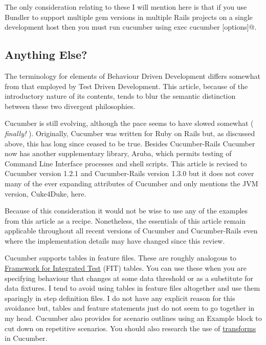 The only consideration relating to these I will mention here is that if you use Bundler to support multiple gem versions in multiple Rails projects on a single development host then you must run cucumber using \verb@bundle exec cucumber [options]@.

\subsection{Anything Else?}

The terminology for elements of Behaviour Driven Development differs somewhat from that employed by Test Driven Development.  This article, because of the introductory nature of its contents, tends to blur the semantic distinction between these two divergent philosophies.

Cucumber is still evolving, although the pace seems to have slowed somewhat ( \emph{finally!} ).  Originally, Cucumber was written for Ruby on Rails but,  as discussed above, this has long since ceased to be true. Besides Cucumber-Rails Cucumber now has another supplementary library, Aruba, which permits testing of Command Line Interface processes and shell scripts.  This article is revised to Cucumber version 1.2.1 and Cucumber-Rails version 1.3.0 but it does not cover many of the ever expanding attributes of Cucumber and only mentions the JVM version, Cuke4Duke, here.

Because of this consideration it would not be wise to use any of the examples from this article as a recipe. Nonetheless, the essentials of this article remain applicable throughout all recent versions of Cucumber and Cucumber-Rails even where the implementation details may have changed since this review.

Cucumber supports tables in feature files.  These are roughly analogous to \href{http://fit.c2.com/}{Framework for Integrated Test} (FIT) tables.  You can use these when you are specifying behaviour that changes at some data threshold or as a substitute for data fixtures.  I tend to avoid using tables in feature files altogether and use them sparingly in step definition files.  I do not have any explicit reason for this avoidance but, tables and feature statements just do not seem to go together in my head.  Cucumber also provides for scenario outlines using an Example block to cut down on repetitive scenarios.  You should also research the use of \href{http://www.engineyard.com/blog/2009/cucumber-step-argument-transforms/}{transforms} in Cucumber.

